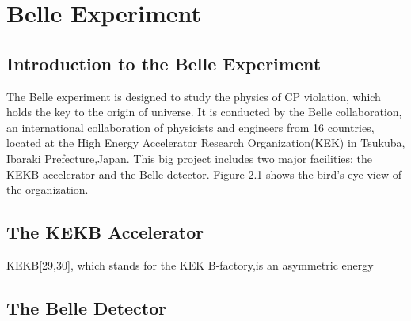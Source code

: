 \chapter{Belle Experiment}
\section{Introduction to the Belle Experiment}
The Belle experiment is designed to study the physics of CP violation,
which holds the key to the origin of universe. It is conducted by the Belle collaboration,
an international collaboration of physicists and engineers from 16 countries,
located at the High Energy Accelerator Research Organization(KEK) in Tsukuba, Ibaraki Prefecture,Japan.
This big project includes two major facilities: the KEKB accelerator and the Belle detector. Figure 2.1 shows
the bird's eye view of the organization.
%
\section{The KEKB Accelerator}
KEKB[29,30], which stands for the KEK B-factory,is an asymmetric energy
\section{The Belle Detector}